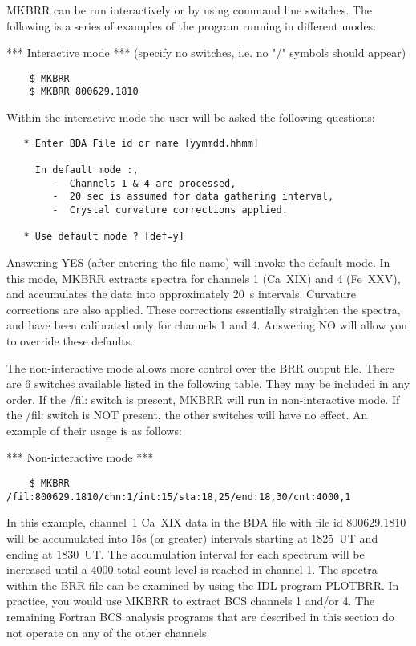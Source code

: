     MKBRR can be run interactively or by using command line switches.
    The following is a series of examples of the program running in different
    modes:
\begin{center}
                   ***	Interactive mode    ***
\newline	(specify no switches, i.e. no "/" symbols should appear)
\end{center}
\begin{verbatim}
    $ MKBRR
    $ MKBRR 800629.1810
\end{verbatim}
  Within the  interactive mode the user will be asked the following questions:
\begin{verbatim}
   * Enter BDA File id or name [yymmdd.hhmm]

     In default mode :,
        -  Channels 1 & 4 are processed,
        -  20 sec is assumed for data gathering interval,
        -  Crystal curvature corrections applied.

   * Use default mode ? [def=y]
\end{verbatim}
Answering YES (after entering the file name) will invoke the default
mode. In this mode, MKBRR extracts spectra for channels 1 (Ca~XIX) and 4
(Fe~XXV), and accumulates the data into approximately 20~s intervals. Curvature
corrections are also applied. These corrections essentially straighten the
spectra, and have been calibrated only for channels 1 and 4. Answering NO
will allow you to override these defaults.

The non-interactive mode allows more control over the BRR output file.
There are 6 switches available listed in the following table.
    They may be included in any order.
    If the /fil: switch is present, MKBRR will run in non-interactive mode.
    If the /fil: switch is NOT present, the other switches will have no effect.
  An example of their usage is as follows:
\begin{center}
                   ***	Non-interactive mode    ***
\end{center}
\begin{verbatim}
    $ MKBRR /fil:800629.1810/chn:1/int:15/sta:18,25/end:18,30/cnt:4000,1
\end{verbatim}
In this example, channel~1 Ca~XIX  data in the BDA file with file id
800629.1810 will be accumulated into 15s (or greater)  intervals starting at
1825~UT and ending at 1830~UT. The accumulation interval for each spectrum
will be increased until a 4000 total count level is reached in channel 1.  The
spectra within the BRR file can be examined by using the IDL program PLOTBRR.
In practice, you would use MKBRR to extract BCS channels 1 and/or 4.
The remaining Fortran BCS analysis programs that are described in this section
do not operate on any of the other channels.

